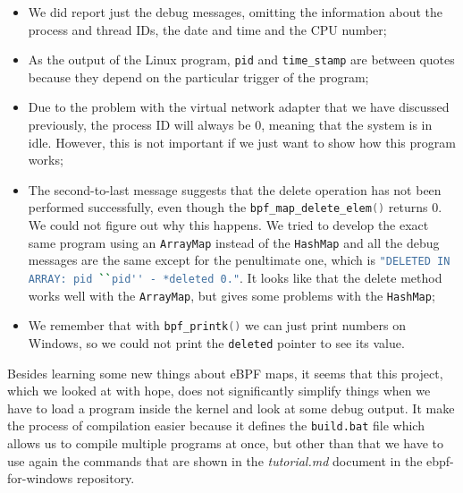 \begin{itemize}
	\item 
		We did report just the debug messages, omitting the information about the process and thread IDs, the date and time and the CPU number;
	\item 
		As the output of the Linux program, \colorbox{backcolour}{\lstinline[style=cstyle, language=C]|pid|} and \colorbox{backcolour}{\lstinline[style=cstyle, language=C]|time_stamp|} are between quotes because they depend on the particular trigger of the program;
	\item 
		Due to the problem with the virtual network adapter that we have discussed previously, the process ID will always be 0, meaning that the system is in idle.
		However, this is not important if we just want to show how this program works;
	\item 
		The second-to-last message suggests that the delete operation has not been performed successfully, even though the \colorbox{backcolour}{\lstinline[style=cstyle, language=C]|bpf_map_delete_elem()|} returns 0.
		We could not figure out why this happens.
		We tried to develop the exact same program using an \colorbox{backcolour}{\lstinline[style=highlight, language=bash]|ArrayMap|} instead of the \colorbox{backcolour}{\lstinline[style=highlight, language=bash]|HashMap|} and all the debug messages are the same except for the penultimate one, which is \colorbox{backcolour}{\lstinline[style=highlight, language=bash]|"DELETED IN ARRAY: pid ``pid'' - *deleted 0."|}.
		It looks like that the delete method works well with the \colorbox{backcolour}{\lstinline[style=highlight, language=bash]|ArrayMap|}, but gives some problems with the \colorbox{backcolour}{\lstinline[style=highlight, language=bash]|HashMap|};
	\item 
		We remember that with \colorbox{backcolour}{\lstinline[style=cstyle, language=C]|bpf_printk()|} we can just print numbers on Windows, so we could not print the \colorbox{backcolour}{\lstinline[style=highlight, language=bash]|deleted|} pointer to see its value.
\end{itemize}

Besides learning some new things about eBPF maps, it seems that this project, which we looked at with hope, does not significantly simplify things when we have to load a program inside the kernel and look at some debug output.
It make the process of compilation easier because it defines the \colorbox{backcolour}{\lstinline[style=commandline, language=bash]|build.bat|} file which allows us to compile multiple programs at once, but other than that we have to use again the commands that are shown in the \textit{tutorial.md} document in the ebpf-for-windows repository.

